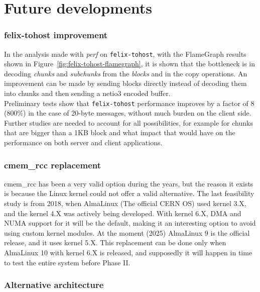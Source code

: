 \section{Future developments}

\subsubsection{felix-tohost improvement}
\label{subsec:felix-tohost-improvement}

In the analysis made with \emph{perf} on \texttt{felix-tohost}, with the FlameGraph results shown in Figure~\ref{fig:felix-tohost-flamegraph}, it is shown that the bottleneck is in decoding \emph{chunks} and \emph{subchunks} from the \emph{blocks} and in the copy operations. An improvement can be made by sending blocks directly instead of decoding them into chunks and then sending a netio3 encoded buffer.\\
Preliminary tests show that \texttt{felix-tohost} performance improves by a factor of 8 (800\%) in the case of 20-byte messages, without much burden on the client side. Further studies are needed to account for all possibilities, for example for chunks that are bigger than a 1KB block and what impact that would have on the performance on both server and client applications.

\subsubsection{cmem\_rcc replacement}

cmem\_rcc has been a very valid option during the years, but the reason it exists is because the Linux kernel could not offer a valid alternative. The last feasibility study is from 2018, when AlmaLinux (The official \acs{CERN} OS) used kernel 3.X, and the kernel 4.X was actively being developed. With kernel 6.X, \acs{DMA} and \acs{NUMA} support for it will be the default, making it an interesting option to avoid using custom kernel modules. At the moment (2025) AlmaLinux 9 is the official release, and it uses kernel 5.X. This replacement can be done only when AlmaLinux 10 with kernel 6.X is released, and supposedly it will happen in time to test the entire system before Phase II.

\subsubsection{Alternative architecture}

